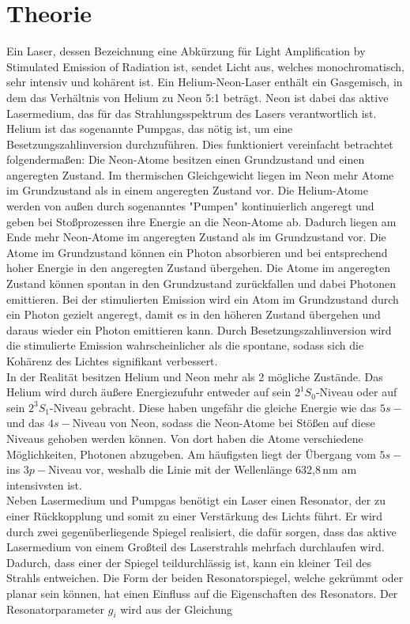 \section{Theorie}
\label{sec:Theorie}


    Ein Laser, dessen Bezeichnung eine Abkürzung für Light Amplification by Stimulated Emission of Radiation ist,
    sendet Licht aus, welches monochromatisch, sehr intensiv und kohärent ist.
    Ein Helium-Neon-Laser enthält ein Gasgemisch, in dem das Verhältnis von Helium zu Neon 5:1 beträgt.
    Neon ist dabei das aktive Lasermedium, das für das Strahlungsspektrum des Lasers verantwortlich ist.
    Helium ist das sogenannte Pumpgas, das nötig ist, um eine Besetzungszahlinversion durchzuführen.
    Dies funktioniert vereinfacht betrachtet folgendermaßen:
    Die Neon-Atome besitzen einen Grundzustand und einen angeregten Zustand.
    Im thermischen Gleichgewicht liegen im Neon mehr Atome im Grundzustand als in einem angeregten Zustand vor.
    Die Helium-Atome werden von außen durch sogenanntes "Pumpen" kontinuierlich angeregt
    und geben bei Stoßprozessen ihre Energie an die Neon-Atome ab.
    Dadurch liegen am Ende mehr Neon-Atome im angeregten Zustand als im Grundzustand vor.
    Die Atome im Grundzustand können ein Photon absorbieren und bei entsprechend hoher Energie
    in den angeregten Zustand übergehen. Die Atome im angeregten Zustand können spontan in den Grundzustand zurückfallen
    und dabei Photonen emittieren.
    Bei der stimulierten Emission wird ein Atom im Grundzustand durch ein Photon gezielt angeregt, damit
    es in den höheren Zustand übergehen und daraus wieder ein Photon emittieren kann.
    Durch Besetzungszahlinversion wird die stimulierte Emission wahrscheinlicher als die spontane,
    sodass sich die Kohärenz des Lichtes signifikant verbessert.\\
    In der Realität besitzen Helium und Neon mehr als 2 mögliche Zustände.
    Das Helium wird durch äußere Energiezufuhr entweder auf sein $2^1S_0$-Niveau oder auf sein $2^3S_1$-Niveau
    gebracht. Diese haben ungefähr die gleiche Energie wie das $5s-$ und das $4s-$Niveau von Neon,
    sodass die Neon-Atome bei Stößen auf diese Niveaus gehoben werden können. Von dort haben die
    Atome verschiedene Möglichkeiten, Photonen abzugeben. Am häufigsten liegt der Übergang vom $5s-$ ins $3p-$Niveau
    vor, weshalb die Linie mit der Wellenlänge 632,8\,nm
    \cite{anleitungv61} am intensivsten ist. \\

    Neben Lasermedium und Pumpgas benötigt ein Laser einen Resonator, der zu einer Rückkopplung und somit
    zu einer Verstärkung des Lichts führt. Er wird durch zwei gegenüberliegende Spiegel realisiert, die
    dafür sorgen, dass das aktive Lasermedium von einem Großteil des Laserstrahls mehrfach durchlaufen wird.
    Dadurch, dass einer der Spiegel teildurchlässig ist, kann ein kleiner Teil des Strahls entweichen.
    Die Form der beiden Resonatorspiegel, welche gekrümmt oder planar sein können,
    hat einen Einfluss auf die Eigenschaften des Resonators.
    Der Resonatorparameter $g_i$ wird aus der Gleichung

